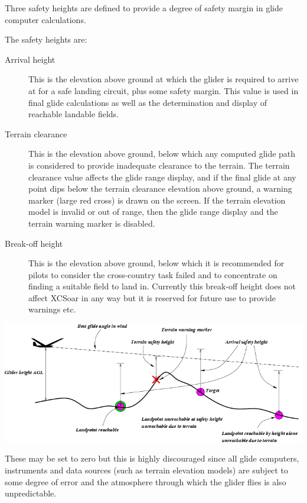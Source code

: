 \documentclass[a4paper,12pt]{refrep}
\begin{document}
Three safety heights are defined to provide a degree of safety margin
in glide computer calculations.  

The safety heights are:
\begin{description}
\item[Arrival height]  This is the elevation above ground at which
 the glider is required to arrive at for a safe landing circuit, plus
 some safety margin.  This value is used in final glide calculations as
 well as the determination and display of reachable landable fields.
\item[Terrain clearance]
 This is the elevation above ground, below which any computed glide
 path is considered to provide inadequate clearance to the terrain.
 The terrain clearance value affects the glide range display, and if
 the final glide at any point dips below the terrain clearance
 elevation above ground, a warning marker (large red cross) is drawn
 on the screen.  If the terrain elevation model is invalid or out of
 range, then the glide range display and the terrain warning marker is
 disabled.
\item[Break-off height]  This is the elevation above ground, below which 
 it is recommended for pilots to consider the cross-country task
 failed and to concentrate on finding a suitable field to land in.
 Currently this break-off height does not affect XCSoar in any way but
 it is reserved for future use to provide warnings etc.
\end{description}

\begin{maxipage}
\begin{center}
\includegraphics[angle=0,width=\linewidth,keepaspectratio='true']{figures/fig-terrain.png}
\end{center}
\end{maxipage}

\warning
These may be set to zero but this is highly discouraged since all
glide computers, instruments and data sources (such as terrain
elevation models) are subject to some degree of error and the
atmosphere through which the glider flies is also unpredictable.
\end{document}
